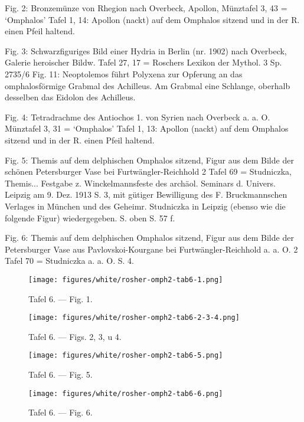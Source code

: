 \documentclass[a4paper, 11pt, oneside]{article}
\begin{document}
Fig. 2: Bronzemünze von Rhegion nach Overbeck, Apollon, Münztafel 3, 43 = `Omphalos' Tafel 1, 14: Apollon (nackt) auf dem Omphalos sitzend und in der R. einen Pfeil haltend.

Fig. 3: Schwarzfiguriges Bild einer Hydria in Berlin (nr. 1902) nach Overbeck, Galerie heroischer Bildw. Tafel 27, 17 = Roschers Lexikon der Mythol. 3 Sp. 2735/6 Fig. 11: Neoptolemos führt Polyxena zur Opferung an das omphalosförmige Grabmal des Achilleus. Am Grabmal eine Schlange, oberhalb desselben das Eidolon des Achilleus.

Fig. 4: Tetradrachme des Antiochos 1. von Syrien nach Overbeck a. a. O. Münztafel 3, 31 = `Omphalos' Tafel 1, 13: Apollon (nackt) auf dem Omphalos sitzend und in der R. einen Pfeil haltend.

Fig. 5: Themis auf dem delphischen Omphalos sitzend, Figur aus dem Bilde der schönen Petersburger Vase bei Furtwängler-Reichhold 2 Tafel 69 = Studniczka, Themis... Festgabe z. Winckelmannsfeste des archäol. Seminars d. Univers. Leipzig am 9. Dez. 1913 S. 3, mit gütiger Bewilligung des F. Bruckmannschen Verlages in München und des Geheimr. Studniczka in Leipzig (ebenso wie die folgende Figur) wiedergegeben. S. oben S. 57 f.

Fig. 6: Themis auf dem delphischen Omphalos sitzend, Figur aus dem Bilde der Petersburger Vase aus Pavlovskoi-Kourgane bei Furtwängler-Reichhold a. a. O. 2 Tafel 70 = Studniczka a. a. O. S. 4.
\clearpage
\begin{landscape}
\vspace*{\fill}
\begin{figure}[H]
\centering
\texttt{[image: figures/white/rosher-omph2-tab6-1.png]}
\caption{Tafel 6. --- Fig. 1.}
\end{figure}
\vspace*{\fill}
\clearpage
\vspace*{\fill}
\begin{figure}[H]
\centering
\texttt{[image: figures/white/rosher-omph2-tab6-2-3-4.png]}
\caption{Tafel 6. --- Figs. 2, 3, u 4.}
\end{figure}
\vspace*{\fill}
\clearpage
\end{landscape}
\vspace*{\fill}
\begin{figure}[H]
\centering
\texttt{[image: figures/white/rosher-omph2-tab6-5.png]}
\caption{Tafel 6. --- Fig. 5.}
\end{figure}
\vspace*{\fill}
\clearpage
\vspace*{\fill}
\begin{figure}[H]
\centering
\texttt{[image: figures/white/rosher-omph2-tab6-6.png]}
\caption{Tafel 6. --- Fig. 6.}
\end{figure}
\vspace*{\fill}
\clearpage
\end{document}
